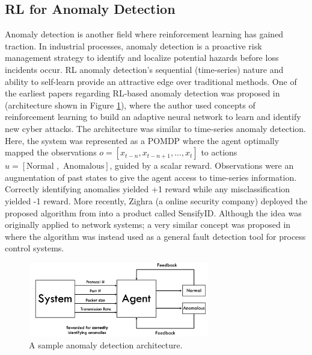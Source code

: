\subsection{RL for Anomaly Detection}
Anomaly detection is another field where reinforcement learning has gained traction. In industrial processes, anomaly detection is a proactive risk management strategy to identify and localize potential hazards before loss incidents occur. RL anomaly detection's sequential (time-series) nature and ability to self-learn provide an attractive edge over traditional methods. One of the earliest papers regarding RL-based anomaly detection was proposed in \cite{seq_anomaly1} (architecture shown in Figure \ref{fig:anomaly_detection}), where the author used concepts of reinforcement learning to build an adaptive neural network to learn and identify new cyber attacks. The architecture was similar to time-series anomaly detection. Here, the system was represented as a POMDP where the agent optimally mapped the observations $o = [x_{t-n}, x_{t-n+1}, ..., x_{t}]$ to actions $u = [\text{Normal }, \text{ Anomalous}]$, guided by a scalar reward. Observations were an augmentation of past states to give the agent access to time-series information. Correctly identifying anomalies yielded +1 reward while any misclassification yielded -1 reward. More recently, Zighra (a online security company) deployed the proposed algorithm from \cite{seq_anomaly1} into a product called SensifyID. Although the idea was originally applied to network systems; a very similar concept was proposed in \cite{ftc} where the algorithm was instead used as a general fault detection tool for process control systems.

\begin{figure}[H]
    \centering
    \includegraphics[width=0.7\textwidth]{images/ch5/anomaly_detection.jpeg}
    \caption{A sample anomaly detection architecture.}
    \label{fig:anomaly_detection}
\end{figure}   

